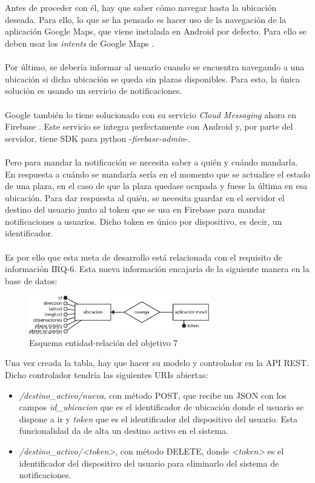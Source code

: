 \\\\
Antes de proceder con él, hay que saber cómo navegar hasta la ubicación deseada. Para ello, lo que se ha pensado es hacer uso de la navegación de la aplicación Google Maps, que viene instalada en Android por defecto. Para ello se deben usar los \textit{intents} de Google Maps \cite{android-maps-intent}.
\\\\
Por último, se debería informar al usuario cuando se encuentra navegando a una ubicación si dicha ubicación se queda sin plazas disponibles. Para esto, la única solución es usando un servicio de notificaciones.
\\\\
Google también lo tiene solucionado con su servicio \textit{Cloud Messaging} ahora en Firebase \cite{firebase}. Este servicio se integra perfectamente con Android y, por parte del servidor, tiene SDK para python -\textit{firebase-admin}-.
\\\\
Pero para mandar la notificación se necesita saber a quién y cuándo mandarla. En respuesta a cuándo se mandaría sería en el momento que se actualice el estado de una plaza, en el caso de que la plaza quedase ocupada y fuese la última en esa ubicación. Para dar respuesta al quién, se necesita guardar en el servidor el destino del usuario junto al token que se usa en Firebase para mandar notificaciones a usuarios. Dicho token es único por dispositivo, es decir, un identificador.
\\\\
Es por ello que esta meta de desarrollo está relacionada con el requisito de información IRQ-6. Esta nueva información encajaría de la siguiente manera en la base de datos:
\begin{figure}[H]
	\centering
	\includegraphics[width=0.7\textwidth]{imagenes/er_objetivo_7.eps}
	\caption{Esquema entidad-relación del objetivo 7}
	\label{er_objetivo_7}
\end{figure}
Una vez creada la tabla, hay que hacer su modelo y controlador en la API REST. Dicho controlador tendría las siguientes URIs abiertas:
\begin{itemize}
	\item \textit{/destino\_activo/nueva}, con método POST, que recibe un JSON con los campos \textit{id\_ubicacion} que es el identificador de ubicación donde el usuario se dispone a ir y \textit{token} que es el identificador del dispositivo del usuario. Esta funcionalidad da de alta un destino activo en el sistema.
	\item \textit{/destino\_activo/<token>}, con método DELETE, donde \textit{<token>} es el identificador del dispositivo del usuario para eliminarlo del sistema de notificaciones.
\end{itemize}
